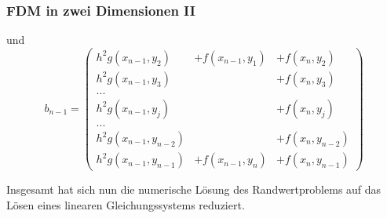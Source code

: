 %
%
\begin{frame}\frametitle{FDM in zwei Dimensionen II}
und
$$
b_{n-1}=\left(\begin{array}{lll}h^2g(x_{n-1},y_2)&+f(x_{n-1},y_1)& +f(x_n,y_2)\\ h^2g(x_{n-1},y_3)&&+f(x_n,y_3)\\ ... \\ h^2g(x_{n-1},y_j)&&+f(x_n,y_j)\\...\\h^2g(x_{n-1},y_{n-2})&&+f(x_n,y_{n-2})\\ h^2g(x_{n-1},y_{n-1})&+f(x_{n-1},y_n)&+f(x_n,y_{n-1}) \end{array}\right)
$$

Insgesamt hat sich nun die numerische Lösung des Randwertproblems auf das Lösen eines linearen Gleichungssystems reduziert.
\end{frame}
%
%
